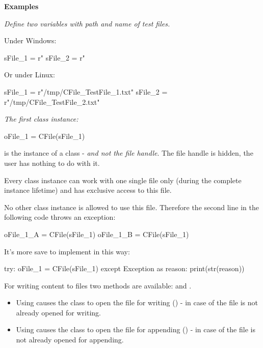 \textbf{Examples}

\textit{Define two variables with path and name of test files.}

Under Windows:

\begin{pythoncode}
sFile_1 = r"%
sFile_2 = r"%
\end{pythoncode}

Or under Linux:

\begin{pythoncode}
sFile_1 = r"/tmp/CFile_TestFile_1.txt"
sFile_2 = r"/tmp/CFile_TestFile_2.txt"
\end{pythoncode}

\textit{The first class instance:}

\begin{pythoncode}
oFile_1 = CFile(sFile_1)
\end{pythoncode}

 is the instance of a class - \textit{and not the file handle}. The file handle is hidden, the user has nothing to do with it.

Every class instance can work with one single file only (during the complete instance lifetime) and has exclusive access to this file.

No other class instance is allowed to use this file. Therefore the second line in the following code throws an exception:

\begin{pythoncode}[linebackgroundcolor=\hlcode{2}]
oFile_1_A = CFile(sFile_1)
oFile_1_B = CFile(sFile_1)
\end{pythoncode}

It's more save to implement in this way:

\begin{pythoncode}
try:
   oFile_1 = CFile(sFile_1)
except Exception as reason:
   print(str(reason))
\end{pythoncode}

For writing content to files two methods are available:  and .

\begin{itemize}
   \item Using  causes the class to open the file for writing () - in case of the file is not already opened for writing.
   \item Using  causes the class to open the file for appending () - in case of the file is not already opened for appending.
\end{itemize}

